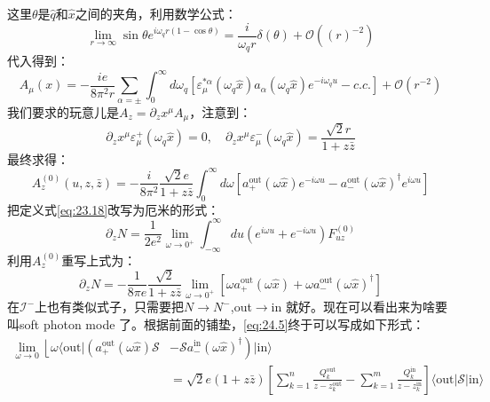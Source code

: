 这里$\theta$是$\hat q$和$\hat x$之间的夹角，利用数学公式：
\begin{equation}
	\lim_{r\to\infty}\sin\theta e^{i\omega_qr(1-\cos\theta)}=\frac{i}{\omega_qr}\delta(\theta)+\mathcal{O}((r)^{-2})
\end{equation}
代入得到：
\begin{equation}
	A_\mu(x)=-\frac{ie}{8\pi^{2}r}\sum_{\alpha=\pm}\int_{0}^{\infty}d\omega_{q}\left[\varepsilon_{\mu}^{*\alpha}(\omega_{q}\hat{x})a_{\alpha}(\omega_{q}\hat{x})e^{-i\omega_{q}u}-c.c.\right]+\mathcal{O}(r^{-2})
\end{equation}
我们要求的玩意儿是$A_{z}=\partial_{z}x^{\mu}A_{\mu}$，注意到：
\[
	\partial_{z}x^{\mu}\varepsilon_{\mu}^{+}(\omega_{q}\hat{x})=0,\quad\partial_{z}x^{\mu}\varepsilon_{\mu}^{-}(\omega_{q}\hat{x})=\frac{\sqrt{2}r}{1+z\bar{z}}
\]
最终求得：
\begin{equation}
	A_{z}^{(0)}(u,z,\bar{z})=-\frac{i}{8\pi^2}\frac{\sqrt{2}e}{1+z\bar{z}}\int_{0}^{\infty}d\omega\left[a_{+}^{\mathrm{out}}(\omega\hat{x})e^{-i\omega u}-a_{-}^{\mathrm{out}}(\omega\hat{x})^\dagger e^{i\omega u}\right]
\end{equation}
把定义式\ref{eq:23.18}改写为厄米的形式：
\begin{equation}
	\partial_zN=\dfrac{1}{2e^2}\lim_{\omega\to0^+}\int_{-\infty}^{\infty}du\left(e^{i\omega u}+e^{-i\omega u}\right)F_{uz}^{(0)}
\end{equation}
利用$A_z^{(0)}$重写上式为：
\begin{equation}
	\partial_zN=-\frac{1}{8\pi e}\frac{\sqrt{2}}{1+z\bar{z}}\lim_{\omega\to0^+}\left[\omega a_+^{\mathrm{out}}(\omega\hat{x})+\omega a_-^{\mathrm{out}}(\omega\hat{x})^\dagger\right]
\end{equation}
在$\mathcal{I}^-$上也有类似式子，只需要把$N\to N^-$,out$\to$in 就好。现在可以看出来为啥要叫soft photon mode 了。根据前面的铺垫，\ref{eq:24.5}终于可以写成如下形式：
\begin{equation}
	\begin{aligned}
		\operatorname*{lim}_{\omega\rightarrow0}\left\lfloor\omega\langle\mathrm{out}|\left(a_{+}^{\mathrm{out}}(\omega\hat{x})\mathcal{S}\right.\right.& \left.-\mathcal{S}a_{-}^{\mathrm{in}}(\omega\hat{x})^{\dagger}\right)|\mathrm{in}\rangle   \\
		&=\sqrt{2}e(1+z\bar{z})\left[\sum_{k=1}^{n}\frac{Q_{k}^\mathrm{out}}{z-z_{k}^\mathrm{out}}-\sum_{k=1}^{m}\frac{Q_{k}^\mathrm{in}}{z-z_{k}^\mathrm{in}}\right]\langle\mathrm{out}|\mathcal{S}|\mathrm{in}\rangle 
	\end{aligned}
\end{equation}
